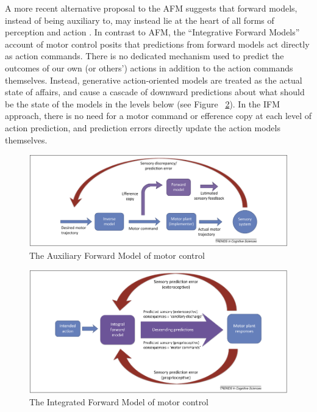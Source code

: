 \begin{CJK}{UTF8}{gbsn}
A more recent alternative proposal to the AFM suggests that forward models, instead of being auxiliary to, may instead lie at the heart of all forms of perception and action \citep{Friston2010}.  In contrast to AFM, the ``Integrative Forward Models'' account of motor control \citep[IFM, see][]{Pickering2014} posits that predictions from forward models act directly as action commands.  There is no dedicated mechanism used to predict the outcomes of our own (or others’) actions in addition to the action commands themselves.  Instead, generative action-oriented models are treated as the actual state of affairs, and cause a cascade of downward predictions about what should be the state of the models in the levels below (see Figure ~\ref{fig:IFM}).  In the IFM approach, there is no need for a motor command or efference copy at each level of action prediction, and prediction errors directly update the action models themselves.



\begin{figure}[htbp]
  \begin{center}
    \includegraphics[scale=.6]{images/AFM.png}
      \caption{The Auxiliary Forward Model of motor control}
        \label{fig:AFM}
   \end{center}
\end{figure}

\begin{figure}[htbp]
  \begin{center}
    \includegraphics[scale=.6]{images/IFM.png}
      \caption{The Integrated Forward Model of motor control}
        \label{fig:IFM}
   \end{center}
\end{figure}



\end{CJK}
